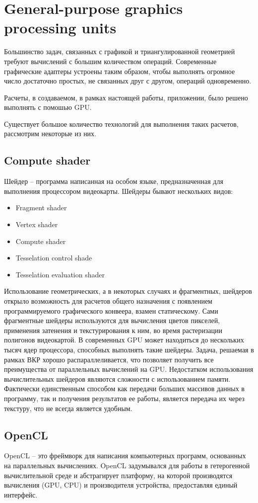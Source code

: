 \clearpage
\section{General-purpose graphics processing units}
Большинство задач, связанных с графикой и триангулированной геометрией требуют вычислений с большим количеством операций. Современные графические адаптеры устроены таким образом, чтобы выполнять огромное число достаточно простых, не связанных друг с другом, операций одновременно.

Расчеты, в создаваемом, в рамках настоящей работы, приложении, было решено выполнять с помошью GPU.

Существует большое количество технологий для выполнения таких расчетов, рассмотрим некоторые из них.

\subsection{Compute shader}
Шейдер -- программа написанная на особом языке, предназначенная для выполнения процессором видеокарты. Шейдеры бывают нескольких видов:
\begin{itemize}
\item Fragment shader
\item Vertex shader
\item Compute shader
\item Tesselation control shade
\item Tesselation evaluation shader
\end{itemize}

Использование геометрических, а в некоторых случаях и фрагментных, шейдеров открыло возможность для расчетов общего назначения с появлением программируемого графического конвеера, взамен статическому. Сами фрагментные шейдеры используются для вычисления цветов пикселей, применения затенения и текстурирования к ним, во время растеризации полигонов видеокартой. В современных GPU может находиться до нескольких тысяч ядер процессора, способных выполнять такие шейдеры. Задача, решаемая в рамках ВКР хорошо распараллеливается, что позволяет получить все преимущества от параллельных вычислений на GPU. Недостатком использования вычислительных шейдеров являются сложности с использованием памяти. Фактически единственным способом как передачи больших массивов данных в программу, так и получения результатов ее работы, является передача их через текстуру, что не всегда является удобным.

\subsection{OpenCL}
OpenCL -- это фреймворк для написания компьютерных программ, основанных на параллельных вычислениях. OpenCL задумывался для работы в гетерогенной вычислительной среде и абстрагирует платформу, на которой производятся вычисления (GPU, CPU) и производителя устройства, предоставляя единый интерфейс.

